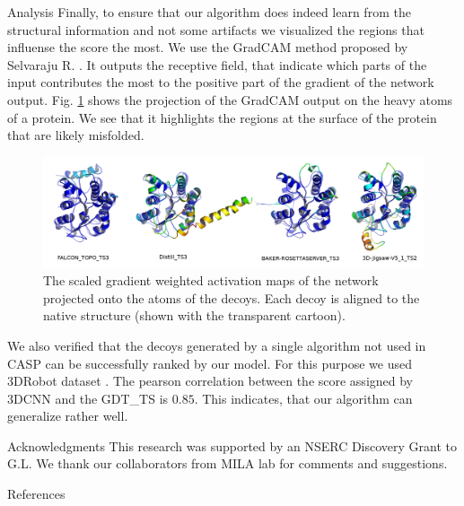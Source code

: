 \documentclass[final, unknownkeysallowed]{beamer}
\begin{document}
\begin{frame}{}
\begin{textblock}{39.0}
\begin{block}{Analysis}
Finally, to ensure that our algorithm does indeed learn from the structural information and not some artifacts we visualized 
the regions that influense the score the most.
We use the GradCAM method proposed by Selvaraju R. \cite{selvaraju2016grad}. 
It outputs the receptive field, that indicate which parts of the input contributes the most to the positive part of the gradient of the network output.
Fig. \ref{Fig:GradCAMT0776_more} shows the projection of the GradCAM output on the heavy atoms of a protein. 
We see that it highlights the regions at the surface of the protein that are likely misfolded.

\begin{figure}[H]
    \centering
    \includegraphics[width=\linewidth]{../draft/Fig/T0776.png}
    \captionsetup{width=0.8\linewidth}
    \caption{The scaled gradient weighted activation maps of the
      network projected onto the atoms of the decoys.  Each decoy is
      aligned to the native structure (shown with the transparent
      cartoon).}
    \label{Fig:GradCAMT0776_more}
\end{figure}

We also verified that the decoys generated by a single algorithm not used in CASP can be successfully ranked by our model.
For this purpose we used 3DRobot dataset \cite{deng20163drobot}. The pearson correlation between the score assigned by 
3DCNN and the GDT\_TS is $0.85$. This indicates, that our algorithm can generalize rather well.

\end{block}




\begin{block}{Acknowledgments}
This research was supported by an NSERC Discovery Grant to G.L.
We thank our collaborators from MILA lab for comments and suggestions.
\end{block}

\begin{block}{References}
{\small
{}}

\end{block}

\end{textblock}

\end{frame}
\end{document}

